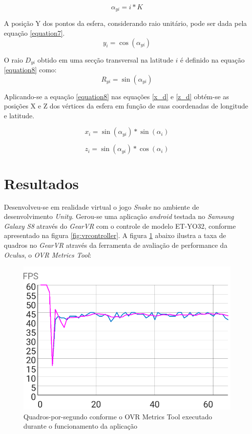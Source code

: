 \documentclass[conference]{IEEEtran}
\begin{document}
\begin{equation}
\alpha_{yi} = i * K
\label{equation6}
\end{equation}

A posição Y dos pontos da esfera, considerando raio unitário, pode ser dada pela equação \ref{equation7}.
\begin{equation}
y_{i} = \cos(\alpha_{yi})
\label{equation7}
\end{equation}

O raio $D_{yi}$ obtido em uma secção transversal na latitude $i$ é definido na equação \ref{equation8} como:
\begin{equation}
R_{yi} = \sin(\alpha_{yi})
\label{equation8}
\end{equation}

Aplicando-se a equação \ref{equation8} nas equações \ref{x_d} e \ref{z_d} obtém-se as posições X e Z dos vértices da esfera em função de suas coordenadas de longitude e latitude.

\begin{equation}
x_{i} = \sin(\alpha_{yi}) * \sin(\alpha_i)
\label{equation9}
\end{equation}

\begin{equation}
z_{i} = \sin(\alpha_{yi}) * \cos(\alpha_i)
\label{equation10}
\end{equation}

\section{Resultados} \label{sec:results}
Desenvolveu-se em realidade virtual o jogo \textit{Snake} no ambiente de desenvolvimento \textit{Unity}. Gerou-se uma aplicação \textit{android} testada no \textit{Samsung Galaxy S8} através do \textit{GearVR} com o controle de modelo ET-YO32, conforme apresentado na figura \ref{fig:vrcontroller}. A figura \ref{fig:VRPerformanceChart} abaixo ilustra a taxa de quadros no \textit{GearVR} através da ferramenta de avaliação de performance da \textit{Oculus}, o \textit{OVR Metrics Tool}:

\begin{figure}[H] \label{fig:VRPerformanceChart}
\centering
\includegraphics[scale=0.5]{VRPerformance}
\caption{Quadros-por-segundo conforme o OVR Metrics Tool executado durante o funcionamento da aplicação }
\end{figure}
\end{document}
